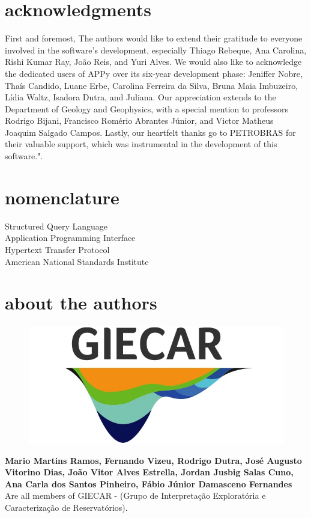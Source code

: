 \documentclass[10pt,twocolumn,twoside]{article}
\begin{document}
\section{acknowledgments}
First and foremost, The authors would like to extend their gratitude to everyone involved in the software's development, especially Thiago Rebeque, Ana Carolina, Rishi Kumar Ray, João Reis, and Yuri Alves. We would also like to acknowledge the dedicated users of APPy over its six-year development phase: Jeniffer Nobre, Thaís Candido, Luane Erbe, Carolina Ferreira da Silva, Bruna Maia Imbuzeiro, Lídia Waltz, Isadora Dutra, and Juliana. Our appreciation extends to the Department of Geology and Geophysics, with a special mention to professors Rodrigo Bijani, Francisco Romério Abrantes Júnior, and Victor Matheus Joaquim Salgado Campos. Lastly, our heartfelt thanks go to PETROBRAS for their valuable support, which was instrumental in the development of this software.".

\section{nomenclature}
  Structured Query Language\\
  Application Programming Interface\\
 Hypertext Transfer Protocol\\
 American National Standards Institute




\section{about the authors}
\setlength\intextsep{0pt}
\begin{figure}
	\includegraphics[width=1.0\linewidth]{logo_giecar3.png}
	\vspace{0.03in}
\end{figure}
\textbf{Mario Martins Ramos, Fernando Vizeu, Rodrigo Dutra, José Augusto Vitorino Dias, João Vitor Alves Estrella, Jordan Jusbig Salas Cuno, Ana Carla dos Santos Pinheiro, Fábio Júnior Damasceno Fernandes} Are all members of GIECAR - (Grupo de Interpretação Exploratória e Caracterização de Reservatórios).
\end{document}
